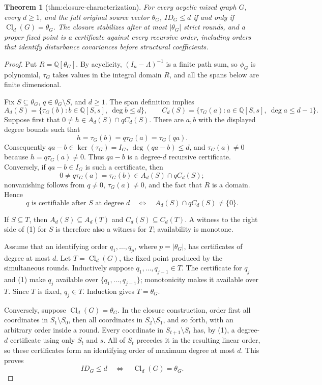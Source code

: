 \documentclass{article}
\newtheorem{theorem}{Theorem}
\begin{document}
\begin{theorem}[thm:closure-characterization]\label{thm:closure-characterization}
For every acyclic mixed graph \(G\), every \(d\ge1\), and the full original source vector \(\theta_G\), \(ID_G\le d\) if and only if \(\operatorname{Cl}_d(G)=\theta_G\). The closure stabilizes after at most \(|\theta_G|\) strict rounds, and a proper fixed point is a certificate against every recursive order, including orders that identify disturbance covariances before structural coefficients.
\end{theorem}
\begin{proof}
Put \(R=\mathbb Q[\theta_G]\).  By acyclicity, \((I_n-\Lambda)^{-1}\) is a finite path sum, so \(\phi_G\) is polynomial, \(\tau_G\) takes values in the integral domain \(R\), and all the spans below are finite dimensional.

Fix \(S\subseteq\theta_G\), \(q\in\theta_G\setminus S\), and \(d\geq1\).  The span definition implies
\[
 A_d(S)=\{\tau_G(b):b\in\mathbb Q[S,s],\ \deg b\leq d\},\qquad
 C_d(S)=\{\tau_G(a):a\in\mathbb Q[S,s],\ \deg a\leq d-1\}.
\]
Suppose first that \(0\neq h\in A_d(S)\cap qC_d(S)\).  There are \(a,b\) with the displayed degree bounds such that
\[
 h=\tau_G(b)=q\tau_G(a)=\tau_G(qa).
\]
Consequently \(qa-b\in\ker(\tau_G)=I_G\), \(\deg(qa-b)\leq d\), and \(\tau_G(a)\neq0\) because \(h=q\tau_G(a)\neq0\).  Thus \(qa-b\) is a degree-\(d\) recursive certificate.  Conversely, if \(qa-b\in I_G\) is such a certificate, then
\[
 0\neq q\tau_G(a)=\tau_G(b)\in A_d(S)\cap qC_d(S);
\]
nonvanishing follows from \(q\neq0\), \(\tau_G(a)\neq0\), and the fact that \(R\) is a domain.  Hence
\[
 q\text{ is certifiable after }S\text{ at degree }d
 \quad\Longleftrightarrow\quad
 A_d(S)\cap qC_d(S)\neq\{0\}. \tag{1}
\]

If \(S\subseteq T\), then \(A_d(S)\subseteq A_d(T)\) and \(C_d(S)\subseteq C_d(T)\).  A witness to the right side of (1) for \(S\) is therefore also a witness for \(T\); availability is monotone.

Assume that an identifying order \(q_1,\ldots,q_p\), where \(p=|\theta_G|\), has certificates of degree at most \(d\).  Let \(T=\operatorname{Cl}_d(G)\), the fixed point produced by the simultaneous rounds.  Inductively suppose \(q_1,\ldots,q_{j-1}\in T\).  The certificate for \(q_j\) and (1) make \(q_j\) available over \(\{q_1,\ldots,q_{j-1}\}\); monotonicity makes it available over \(T\).  Since \(T\) is fixed, \(q_j\in T\).  Induction gives \(T=\theta_G\).

Conversely, suppose \(\operatorname{Cl}_d(G)=\theta_G\).  In the closure construction, order first all coordinates in \(S_1\setminus S_0\), then all coordinates in \(S_2\setminus S_1\), and so forth, with an arbitrary order inside a round.  Every coordinate in \(S_{t+1}\setminus S_t\) has, by (1), a degree-\(d\) certificate using only \(S_t\) and \(s\).  All of \(S_t\) precedes it in the resulting linear order, so these certificates form an identifying order of maximum degree at most \(d\).  This proves
\[
 ID_G\leq d\quad\Longleftrightarrow\quad\operatorname{Cl}_d(G)=\theta_G.
\]


\end{proof}
\end{document}
